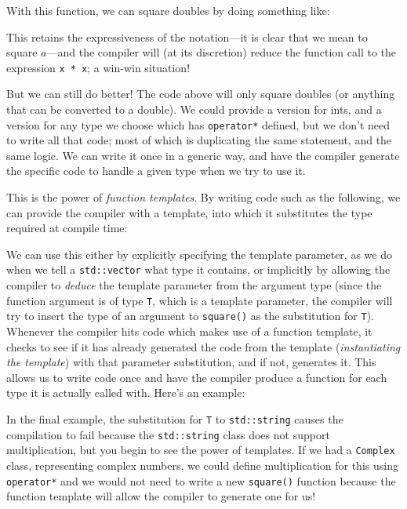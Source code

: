 \documentclass[a4paper]{scrartcl}
\begin{document}


With this function, we can square doubles by doing something like:



This retains the expressiveness of the notation---it is clear that we mean to square $a$---and the compiler will (at its discretion) reduce the function call to the expression \verb|x * x|; a win-win situation!

But we can still do better! The code above will only square doubles (or anything that can be converted to a double). We could provide a version for ints, and a version for any type we choose which has \verb|operator*| defined, but we don't need to write all that code; most of which is duplicating the same statement, and the same logic. We can write it once in a generic way, and have the compiler generate the specific code to handle a given type when we try to use it.

This is the power of \emph{function templates}. By writing code such as the following, we can provide the compiler with a template, into which it substitutes the type required at compile time:



We can use this either by explicitly specifying the template parameter, as we do when we tell a \verb|std::vector| what type it contains, or implicitly by allowing the compiler to \emph{deduce} the template parameter from the argument type (since the function argument is of type \verb|T|, which is a template parameter, the compiler will try to insert the type of an argument to \verb|square()| as the substitution for \verb|T|). Whenever the compiler hits code which makes use of a function template, it checks to see if it has already generated the code from the template (\emph{instantiating the template}) with that parameter substitution, and if not, generates it. This allows us to write code once and have the compiler produce a function for each type it is actually called with. Here's an example:





In the final example, the substitution for \verb|T| to \verb|std::string| causes the compilation to fail because the \verb|std::string| class does not support multiplication, but you begin to see the power of templates. If we had a \verb|Complex| class, representing complex numbers, we could define multiplication for this using \verb|operator*| and we would not need to write a new \verb|square()| function because the function template will allow the compiler to generate one for us!
\end{document}
